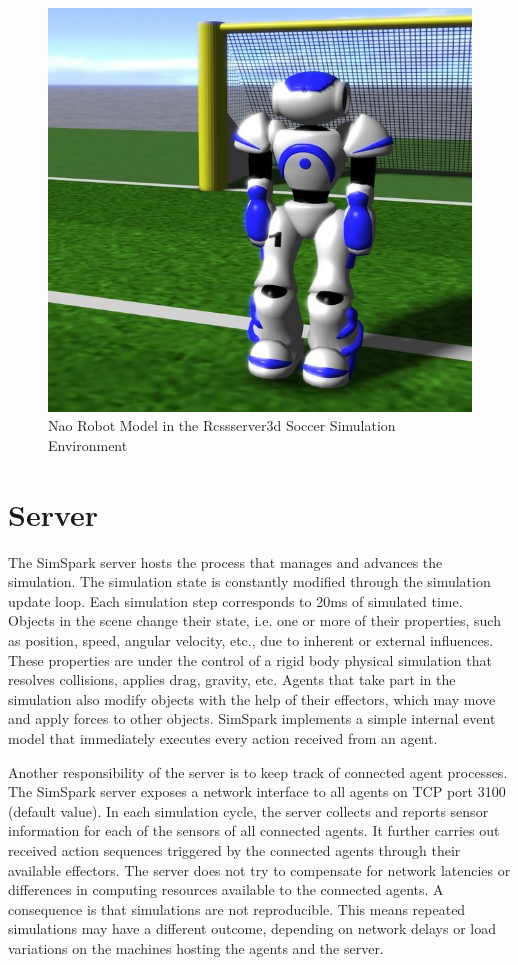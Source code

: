 \begin{figure}[t!]
\centering
  \includegraphics[scale=0.3]{Chapter2/figures/629px-Models-nao.jpg}
  \caption{Nao Robot Model in the Rcssserver3d Soccer Simulation Environment} 
  \label{fig:Naoinsimulationscreen}
\end{figure}

\section{Server}
The SimSpark server hosts the process that manages and advances the simulation. The simulation state is constantly modified through the simulation update loop. Each simulation step corresponds to 20ms of simulated time. Objects in the scene change their state, i.e. one or more of their properties, such as position, speed, angular velocity, etc., due to inherent or external influences. These properties are under the control of a rigid body physical simulation that resolves collisions, applies drag, gravity, etc. Agents that take part in the simulation also modify objects with the help of their effectors, which may move and apply forces to other objects. SimSpark implements a simple internal event model that immediately executes every action received from an agent.


Another responsibility of the server is to keep track of connected agent processes. The SimSpark server exposes a network interface to all agents on TCP port 3100 (default value). In each simulation cycle, the server collects and reports sensor information for each of the sensors of all connected agents. It further carries out received action sequences triggered by the connected agents through their available effectors.
The server does not try to compensate for network latencies or differences in computing resources available to the connected agents. A consequence is that simulations are not reproducible. This means repeated simulations may have a different outcome, depending on network delays or load variations on the machines hosting the agents and the server.


